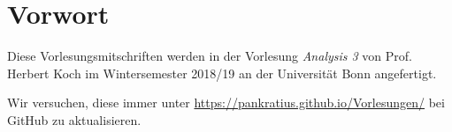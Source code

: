 \chapter*{Vorwort}
Diese Vorlesungsmitschriften werden in der Vorlesung \textit{Analysis 3} von Prof. Herbert Koch im Wintersemester 2018/19 an der Universität Bonn angefertigt.\par
Wir versuchen, diese immer unter \url{https://pankratius.github.io/Vorlesungen/} bei GitHub zu aktualisieren.
